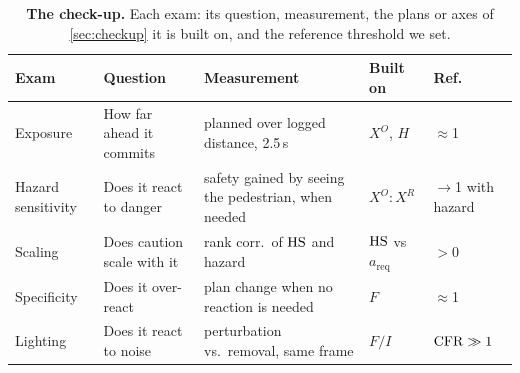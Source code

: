 \begin{table}[t]
\centering
\caption{\textbf{The check-up.} Each exam: its question, measurement, the plans or axes of \cref{sec:checkup} it is built on, and the reference threshold we set.}
\label{tab:exams}
\footnotesize
\setlength{\tabcolsep}{3pt}\renewcommand{\arraystretch}{0.92}\setlength{\abovecaptionskip}{2pt}\setlength{\belowcaptionskip}{-4pt}
\begin{tabular}{@{}lllll@{}}
\toprule
Exam & Question & Measurement & Built on & Ref. \\
\midrule
Exposure & How far ahead it commits & planned over logged distance, 2.5\,s & $X^{O}$, $H$ & $\approx$1 \\
Hazard sensitivity & Does it react to danger & safety gained by seeing the pedestrian, when needed & $X^{O}\!:\!X^{R}$ & $\to$1 with hazard \\
Scaling & Does caution scale with it & rank corr.\ of $\mathrm{HS}$ and hazard & $\mathrm{HS}$ vs $a_{\mathrm{req}}$ & $>0$ \\
Specificity & Does it over-react & plan change when no reaction is needed & $F$ & $\approx$1 \\
Lighting & Does it react to noise & perturbation vs.\ removal, same frame & $F/I$ & $\mathrm{CFR}\gg1$ \\
\bottomrule
\end{tabular}
\end{table}
